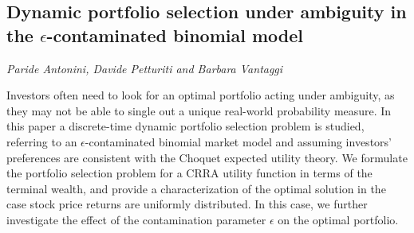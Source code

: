 \documentclass[../booklet.tex]{subfiles}
\begin{document}
\subsection[Dynamic portfolio selection under ambiguity in the $\epsilon$-contaminated binomial model. {\it Paride Antonini, Davide Petturiti and Barbara Vantaggi}]{Dynamic portfolio selection under ambiguity in the $\epsilon$-contaminated binomial model}
  

\begin{center}
  {\it Paride Antonini, Davide Petturiti and Barbara Vantaggi}
\end{center}

\vskip 0.8cm


Investors often need to look for an optimal portfolio acting under ambiguity, as they may not be able to single out a unique real-world probability measure. In this paper a discrete-time dynamic portfolio selection problem is studied, referring to an $\epsilon$-contaminated binomial market model and assuming investors' preferences
are consistent with the Choquet expected utility theory.  We formulate the portfolio selection problem for a CRRA utility function in terms of the terminal wealth, and provide a characterization of the optimal solution in the case stock price returns are uniformly distributed. In this case, we further
investigate the effect of the contamination parameter $\epsilon$ on the optimal portfolio.
\end{document}
